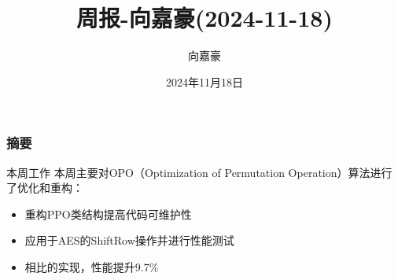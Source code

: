 \documentclass{beamer}
\title{\textbf{周报-向嘉豪(2024-11-18)}}
\author{向嘉豪}
\institute{衡阳师范学院}
\date{2024年11月18日}
\begin{document}
\begin{frame}
    \titlepage
\end{frame}

\begin{frame}
    \frametitle{摘要}
    \begin{block}{本周工作}
        本周主要对OPO（Optimization of Permutation Operation）算法进行了优化和重构：
        \begin{itemize}
            \item 重构PPO类结构提高代码可维护性
            \item 应用于AES的ShiftRow操作并进行性能测试
            \item 相比\cite{Schwabe2016}的实现，性能提升9.7\%
        \end{itemize}
    \end{block}
\end{frame}
\end{document}

